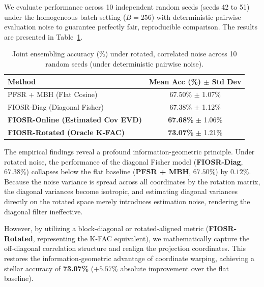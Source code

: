We evaluate performance across 10 independent random seeds (seeds 42 to 51) under the homogeneous batch setting ($B=256$) with deterministic pairwise evaluation noise to guarantee perfectly fair, reproducible comparison. The results are presented in Table~\ref{tab:rotated_results}.

\begin{table}[h]
\caption{Joint ensembling accuracy (\%) under rotated, correlated noise across 10 random seeds (under deterministic pairwise noise).}
\label{tab:rotated_results}
\begin{center}
\begin{small}
\begin{sc}
\begin{tabular}{lc}
\toprule
Method & Mean Acc (\%) $\pm$ Std Dev \\
\midrule
PFSR + MBH (Flat Cosine) & 67.50\% $\pm$ 1.07\% \\
FIOSR-Diag (Diagonal Fisher) & 67.38\% $\pm$ 1.12\% \\
\textbf{FIOSR-Online (Estimated Cov EVD)} & \textbf{67.68\%} $\pm$ 1.06\% \\
\textbf{FIOSR-Rotated (Oracle K-FAC)} & \textbf{73.07\%} $\pm$ 1.21\% \\
\bottomrule
\end{tabular}
\end{sc}
\end{small}
\end{center}
\end{table}

The empirical findings reveal a profound information-geometric principle. Under rotated noise, the performance of the diagonal Fisher model (\textbf{FIOSR-Diag}, $67.38\%$) collapses below the flat baseline (\textbf{PFSR + MBH}, $67.50\%$) by $0.12\%$. Because the noise variance is spread across all coordinates by the rotation matrix, the diagonal variances become isotropic, and estimating diagonal variances directly on the rotated space merely introduces estimation noise, rendering the diagonal filter ineffective.

However, by utilizing a block-diagonal or rotated-aligned metric (\textbf{FIOSR-Rotated}, representing the K-FAC equivalent), we mathematically capture the off-diagonal correlation structure and realign the projection coordinates. This restores the information-geometric advantage of coordinate warping, achieving a stellar accuracy of \textbf{73.07\%} ($+5.57\%$ absolute improvement over the flat baseline). 

